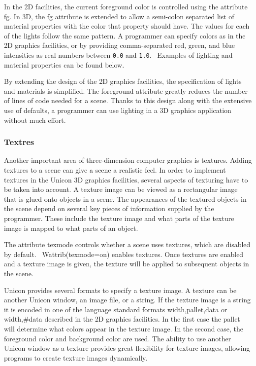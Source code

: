 In the 2D facilities, the current foreground color is controlled using
the attribute fg. In 3D, the fg attribute is extended to allow a
semi-colon separated list of material properties with the color that
property should have. The values for each of the lights follow the same
pattern. A programmer can specify colors as in the 2D graphics
facilities, or by providing comma-separated red, green, and blue
intensities as real numbers between \texttt{0.0} and \texttt{1.0}.
\ Examples of lighting and material properties can be found below.

By extending the design of the 2D graphics facilities, the specification
of lights and materials is simplified. The foreground attribute greatly
reduces the number of lines of code needed for a scene. Thanks to this
design along with the extensive use of defaults, a programmer can use
lighting in a 3D graphics application without much effort.

\subsubsection[Textures]{Textres}
Another important area of three-dimension computer graphics is textures.
Adding textures to a scene can give a scene a realistic feel. In order
to implement textures in the Unicon 3D graphics facilities, several
aspects of texturing have to be taken into account. A texture image can
be viewed as a rectangular image that is
{\textquotedbl}glued{\textquotedbl} onto objects in a scene. The
appearances of the textured objects in the scene depend on several key
pieces of information supplied by the programmer. These include the
texture image and what parts of the texture image is mapped to what
parts of an object.

The attribute texmode controls whether a scene uses textures, which are
disabled by default.
\ Wattrib({\textquotedbl}texmode=on{\textquotedbl}) enables textures.
Once textures are enabled and a texture image is given, the texture
will be applied to subsequent objects in the scene. 

Unicon provides several formats to specify a texture image. A texture
can be another Unicon window, an image file, or a string. If the
texture image is a string it is encoded in one of the language standard
formats {\textquotedbl}width,pallet,data{\textquotedbl} or
{\textquotedbl}width,\#data{\textquotedbl} described in the 2D graphics
facilities. In the first case the pallet will determine what colors
appear in the texture image. In the second case, the foreground color
and background color are used. The ability to use another Unicon
window as a texture provides great flexibility for texture images,
allowing programs to create texture images dynamically.

